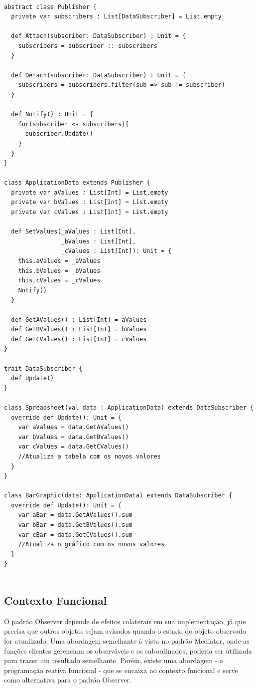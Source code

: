 \begin{lstlisting}[caption={Observer Orientação a Objetos.},label=ooobserver]

abstract class Publisher {
  private var subscribers : List[DataSubscriber] = List.empty

  def Attach(subscriber: DataSubscriber) : Unit = {
    subscribers = subscriber :: subscribers
  }

  def Detach(subscriber: DataSubscriber) : Unit = {
    subscribers = subscribers.filter(sub => sub != subscriber)
  }

  def Notify() : Unit = {
    for(subscriber <- subscribers){
      subscriber.Update()
    }
  }
}

class ApplicationData extends Publisher {
  private var aValues : List[Int] = List.empty
  private var bValues : List[Int] = List.empty
  private var cValues : List[Int] = List.empty

  def SetValues(_aValues : List[Int],
                _bValues : List[Int],
                _cValues : List[Int]): Unit = {
    this.aValues = _aValues
    this.bValues = _bValues
    this.cValues = _cValues
    Notify()
  }

  def GetAValues() : List[Int] = aValues
  def GetBValues() : List[Int] = bValues
  def GetCValues() : List[Int] = cValues
}

trait DataSubscriber {
  def Update()
}

class Spreadsheet(val data : ApplicationData) extends DataSubscriber {
  override def Update(): Unit = {
    var aValues = data.GetAValues()
    var bValues = data.GetBValues()
    var cValues = data.GetCValues()
    //Atualiza a tabela com os novos valores
  }
}

class BarGraphic(data: ApplicationData) extends DataSubscriber {
  override def Update(): Unit = {
    var aBar = data.GetAValues().sum
    var bBar = data.GetBValues().sum
    var cBar = data.GetCValues().sum
    //Atualiza o gráfico com os novos valores
  }
}
    
\end{lstlisting}

\subsection*{Contexto Funcional}

O padrão Observer depende de 
efeitos colaterais em sua implementação, 
já que precisa que outros objetos sejam avisados 
quando o estado do objeto observado for 
atualizado. Uma abordagem semelhante à vista 
no padrão Mediator, onde as funções clientes 
gerenciam os observáveis e os subordinados, 
poderia ser utilizada para trazer um resultado 
semelhante. Porém, existe uma abordagem - a 
programação reativa funcional - que se encaixa 
no contexto funcional e serve como alternativa 
para o padrão Observer\cite{reactiveprog}.

